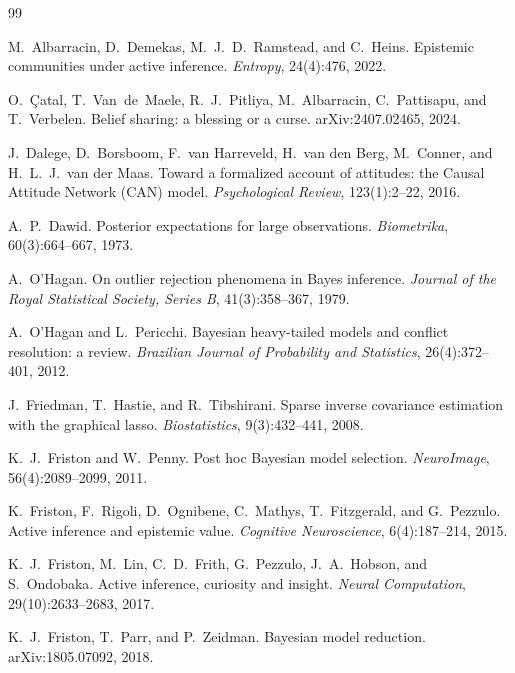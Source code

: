 \documentclass[runningheads]{llncs}
\begin{document}
\begin{thebibliography}{99}

M.~Albarracin, D.~Demekas, M.~J.~D.~Ramstead, and C.~Heins.
Epistemic communities under active inference. \emph{Entropy}, 24(4):476, 2022.

O.~\c{C}atal, T.~Van~de~Maele, R.~J.~Pitliya, M.~Albarracin, C.~Pattisapu, and T.~Verbelen.
Belief sharing: a blessing or a curse. arXiv:2407.02465, 2024.

J.~Dalege, D.~Borsboom, F.~van Harreveld, H.~van den Berg, M.~Conner, and H.~L.~J.~van der Maas.
Toward a formalized account of attitudes: the Causal Attitude Network (CAN) model.
\emph{Psychological Review}, 123(1):2--22, 2016.

A.~P.~Dawid.
Posterior expectations for large observations. \emph{Biometrika}, 60(3):664--667, 1973.

A.~O'Hagan.
On outlier rejection phenomena in Bayes inference.
\emph{Journal of the Royal Statistical Society, Series B}, 41(3):358--367, 1979.

A.~O'Hagan and L.~Pericchi.
Bayesian heavy-tailed models and conflict resolution: a review.
\emph{Brazilian Journal of Probability and Statistics}, 26(4):372--401, 2012.

J.~Friedman, T.~Hastie, and R.~Tibshirani.
Sparse inverse covariance estimation with the graphical lasso.
\emph{Biostatistics}, 9(3):432--441, 2008.

K.~J.~Friston and W.~Penny.
Post hoc Bayesian model selection. \emph{NeuroImage}, 56(4):2089--2099, 2011.

K.~Friston, F.~Rigoli, D.~Ognibene, C.~Mathys, T.~Fitzgerald, and G.~Pezzulo.
Active inference and epistemic value. \emph{Cognitive Neuroscience}, 6(4):187--214, 2015.

K.~J.~Friston, M.~Lin, C.~D.~Frith, G.~Pezzulo, J.~A.~Hobson, and S.~Ondobaka.
Active inference, curiosity and insight. \emph{Neural Computation}, 29(10):2633--2683, 2017.

K.~J.~Friston, T.~Parr, and P.~Zeidman.
Bayesian model reduction. arXiv:1805.07092, 2018.


\end{thebibliography}
\end{document}
